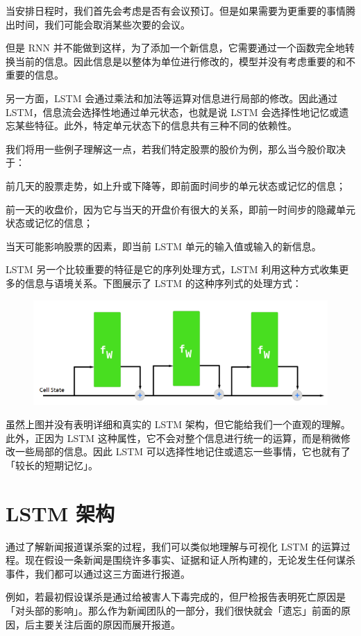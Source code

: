 \documentclass{article}
\begin{document}
当安排日程时，我们首先会考虑是否有会议预订。但是如果需要为更重要的事情腾出时间，我们可能会取消某些次要的会议。

但是 RNN 并不能做到这样，为了添加一个新信息，它需要通过一个函数完全地转换当前的信息。因此信息是以整体为单位进行修改的，模型并没有考虑重要的和不重要的信息。

另一方面，LSTM 会通过乘法和加法等运算对信息进行局部的修改。因此通过 LSTM，信息流会选择性地通过单元状态，也就是说 LSTM 会选择性地记忆或遗忘某些特征。此外，特定单元状态下的信息共有三种不同的依赖性。

我们将用一些例子理解这一点，若我们特定股票的股价为例，那么当今股价取决于：

前几天的股票走势，如上升或下降等，即前面时间步的单元状态或记忆的信息；

前一天的收盘价，因为它与当天的开盘价有很大的关系，即前一时间步的隐藏单元状态或记忆的信息；

当天可能影响股票的因素，即当前 LSTM 单元的输入值或输入的新信息。

LSTM 另一个比较重要的特征是它的序列处理方式，LSTM 利用这种方式收集更多的信息与语境关系。下图展示了 LSTM 的这种序列式的处理方式：
\begin{figure}[H]
	\centering
	\includegraphics[scale=0.3]{1.png}
\end{figure}
虽然上图并没有表明详细和真实的 LSTM 架构，但它能给我们一个直观的理解。此外，正因为 LSTM 这种属性，它不会对整个信息进行统一的运算，而是稍微修改一些局部的信息。因此 LSTM 可以选择性地记住或遗忘一些事情，它也就有了「较长的短期记忆」。

\section{LSTM 架构}

通过了解新闻报道谋杀案的过程，我们可以类似地理解与可视化 LSTM 的运算过程。现在假设一条新闻是围绕许多事实、证据和证人所构建的，无论发生任何谋杀事件，我们都可以通过这三方面进行报道。

例如，若最初假设谋杀是通过给被害人下毒完成的，但尸检报告表明死亡原因是「对头部的影响」。那么作为新闻团队的一部分，我们很快就会「遗忘」前面的原因，后主要关注后面的原因而展开报道。
\end{document}
